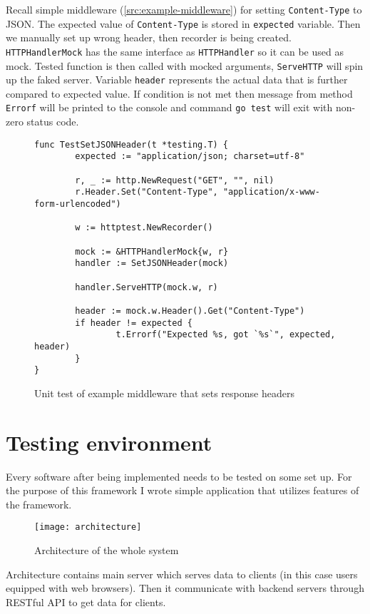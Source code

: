 Recall simple middleware (\ref{src:example-middleware}) for setting
\verb|Content-Type| to JSON\@. The expected value of  \verb|Content-Type| is
stored in \verb|expected| variable. Then we manually set up wrong header, then
recorder is being created. \verb|HTTPHandlerMock| has the same interface as
\verb|HTTPHandler| so it can be used as mock. Tested function is then called
with mocked arguments, \verb|ServeHTTP| will spin up the faked server. Variable
\verb|header| represents the actual data that is further compared to expected
value. If condition is not met then message from method \verb|Errorf| will be
printed to the console and command \verb|go test| will exit with non-zero
status code.

\begin{figure}[!htbp]
\begin{verbatim}
func TestSetJSONHeader(t *testing.T) {
        expected := "application/json; charset=utf-8"

        r, _ := http.NewRequest("GET", "", nil)
        r.Header.Set("Content-Type", "application/x-www-form-urlencoded")

        w := httptest.NewRecorder()

        mock := &HTTPHandlerMock{w, r}
        handler := SetJSONHeader(mock)

        handler.ServeHTTP(mock.w, r)

        header := mock.w.Header().Get("Content-Type")
        if header != expected {
                t.Errorf("Expected %s, got `%s`", expected, header)
        }
}
\end{verbatim}
\renewcommand\figurename{Code}
\caption{Unit test of example middleware that sets response headers}
\label{src:test-example-middleware}
\end{figure}

\section{Testing environment}
Every software after being implemented needs to be tested on some set up. For
the purpose of this framework I wrote simple application that utilizes features
of the framework.

\begin{figure}[!htbp]
\centering
\texttt{[image: architecture]}
\label{fig:architecture}
\caption{Architecture of the whole system}
\end{figure}

Architecture contains main server which serves data to clients (in this case
users equipped with web browsers). Then it communicate with backend servers
through RESTful API to get data for clients.

